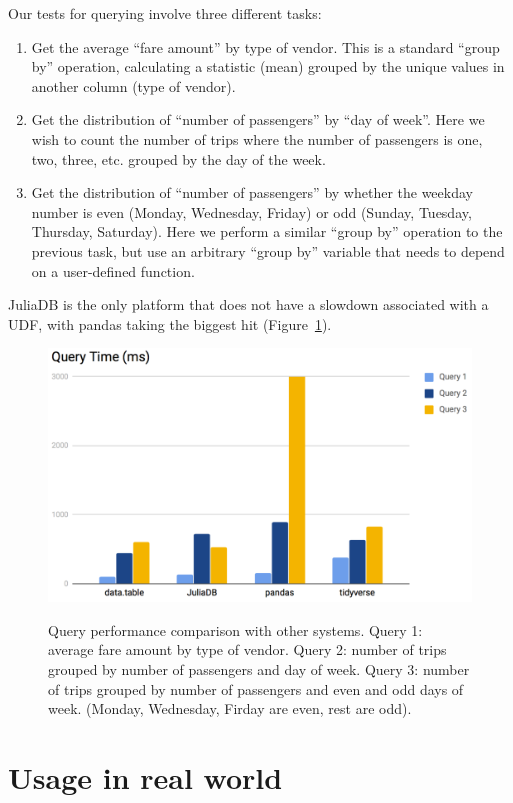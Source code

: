 \documentclass{juliacon}
\begin{document}
Our tests for querying involve three different tasks: 
\begin{enumerate}
\item Get the average “fare amount” by type of vendor. This is a standard
“group by” operation, calculating a statistic (mean) grouped by the
unique values in another column (type of vendor). 
\item Get the distribution of “number of passengers” by “day of week”. Here
we wish to count the number of trips where the number of passengers
is one, two, three, etc. grouped by the day of the week. 
\item Get the distribution of “number of passengers” by whether the weekday
number is even (Monday, Wednesday, Friday) or odd (Sunday, Tuesday,
Thursday, Saturday). Here we perform a similar “group by” operation
to the previous task, but use an arbitrary “group by” variable that
needs to depend on a user-defined function. 
\end{enumerate}
JuliaDB is the only platform that does not have a slowdown associated
with a UDF, with pandas taking the biggest hit (Figure~\ref{fig:nyctaxiquery}).

\begin{figure}[h]
    \centering \includegraphics[width=5in]{image4.png}
    \label{fig:nyctaxiquery} 
    \caption{Query performance comparison with other systems. Query 1: average fare amount by type of vendor. Query 2: number of trips grouped by number of passengers and day of week. Query 3: number of trips grouped by number of passengers and even and odd days of week. (Monday, Wednesday, Firday are even, rest are odd).}
\end{figure}

\section{Usage in real world}
\end{document}
